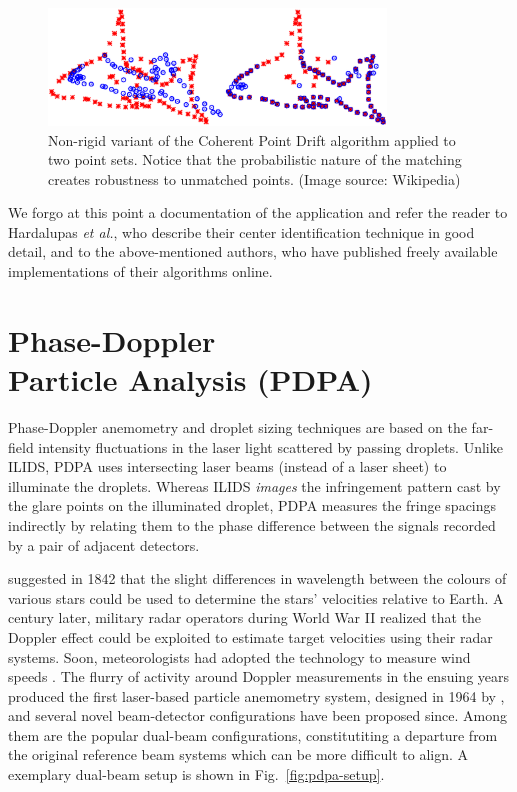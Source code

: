 \documentclass[11.5pt,oneside]{book}
\newcommand*{\figref}[1]{Fig.~\ref{#1}}
\begin{document}
\begin{figure}
    \centering
    \includegraphics[width=0.8\textwidth]{img/orb/pointset.eps}
    \caption{Non-rigid variant of the Coherent Point Drift algorithm applied to
    two point sets. Notice that the probabilistic nature of the matching creates
robustness to unmatched points. (Image source: Wikipedia)}
    \label{fig:cpd}
\end{figure}

We forgo at this point a documentation of the application and refer the reader to
Hardalupas \emph{et al.}, who describe their center identification technique in
good detail, and to the above-mentioned authors, who have published freely
available implementations of their algorithms online.


\chapter[Phase-Doppler Particle Analysis]{Phase-Doppler\\Particle Analysis (PDPA)}
Phase-Doppler anemometry and droplet sizing techniques are based on the
far-field intensity fluctuations in the laser light scattered by passing
droplets. Unlike ILIDS, PDPA uses intersecting laser beams (instead of
a laser sheet) to illuminate the droplets. Whereas ILIDS \emph{images} the
infringement pattern cast by the glare points on the illuminated droplet, PDPA
measures the fringe spacings indirectly by relating them to the phase difference 
between the signals recorded by a pair of adjacent detectors. 

\citet{Doppler42} suggested in 1842 that the slight differences in wavelength between
the colours of various stars could be used to determine the stars' velocities relative to
Earth. A century later, military radar operators during World War II realized that the Doppler
effect could be exploited to estimate target velocities using their radar
systems. Soon, meteorologists had adopted the technology to measure wind speeds
\cite{Whiton98}. The flurry of activity around Doppler measurements in the
ensuing years produced the first laser-based particle anemometry system,
designed in 1964 by \citet{Yeh64}, and several novel beam-detector
configurations have been proposed since. Among them are the popular dual-beam
configurations, constitutiting a departure from the original reference beam
systems which can be more difficult to align. A exemplary dual-beam setup is
shown in \figref{fig:pdpa-setup}.
\end{document}
